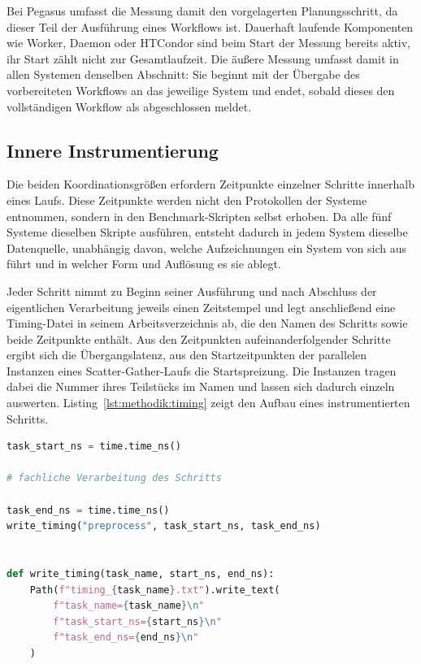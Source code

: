 Bei Pegasus umfasst die Messung damit den vorgelagerten
Planungsschritt, da dieser Teil der Ausführung eines Workflows ist. Dauerhaft laufende Komponenten wie Worker, Daemon oder HTCondor sind beim Start der Messung bereits aktiv, ihr Start zählt nicht zur Gesamtlaufzeit. Die äußere Messung umfasst damit in allen Systemen denselben Abschnitt: Sie beginnt mit der Übergabe des vorbereiteten Workflows an das jeweilige System und endet, sobald dieses den vollständigen Workflow als abgeschlossen meldet.

\subsection{Innere Instrumentierung}
\label{sec:methodik:instrumentierung}

Die beiden Koordinationsgrößen erfordern Zeitpunkte einzelner
Schritte innerhalb eines Laufs. Diese Zeitpunkte werden nicht den
Protokollen der Systeme entnommen, sondern in den
Benchmark-Skripten selbst erhoben. Da alle fünf Systeme dieselben
Skripte ausführen, entsteht dadurch in jedem System dieselbe
Datenquelle, unabhängig davon, welche Aufzeichnungen ein System von
sich aus führt und in welcher Form und Auflösung es sie ablegt.

Jeder Schritt nimmt zu Beginn seiner Ausführung und nach Abschluss
der eigentlichen Verarbeitung jeweils einen Zeitstempel und legt anschließend eine Timing-Datei
in seinem Arbeitsverzeichnis ab, die den Namen des Schritts sowie
beide Zeitpunkte enthält. Aus den Zeitpunkten aufeinanderfolgender
Schritte ergibt sich die Übergangslatenz, aus den Startzeitpunkten
der parallelen Instanzen eines Scatter-Gather-Laufs die
Startspreizung. Die Instanzen tragen dabei die Nummer ihres
Teilstücks im Namen und lassen sich dadurch einzeln auswerten.
Listing~\ref{lst:methodik:timing} zeigt den Aufbau eines
instrumentierten Schritts.

\begin{lstlisting}[language=Python,
  caption={Aufbau eines instrumentierten Benchmark-Schritts},
  label={lst:methodik:timing}]
task_start_ns = time.time_ns()

# fachliche Verarbeitung des Schritts

task_end_ns = time.time_ns()
write_timing("preprocess", task_start_ns, task_end_ns)


def write_timing(task_name, start_ns, end_ns):
    Path(f"timing_{task_name}.txt").write_text(
        f"task_name={task_name}\n"
        f"task_start_ns={start_ns}\n"
        f"task_end_ns={end_ns}\n"
    )
\end{lstlisting}


